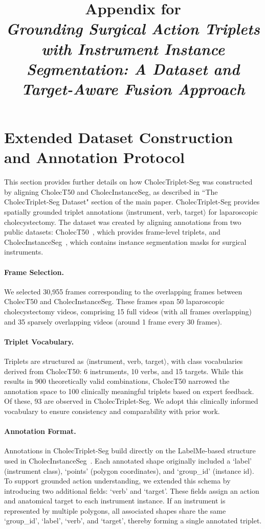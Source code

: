 \documentclass[11pt]{article}
\title{Appendix for\\[0.3em] \textit{Grounding Surgical Action Triplets with Instrument Instance Segmentation: A
Dataset and Target-Aware Fusion Approach}}
\date{} %
\begin{document}
\linenumbers

\maketitle

\section{Extended Dataset Construction and Annotation Protocol}
This section provides further details on how CholecTriplet-Seg was constructed by aligning CholecT50 and CholecInstanceSeg, as described in ``The CholecTriplet-Seg Dataset" section of the main paper. CholecTriplet-Seg provides spatially grounded triplet annotations $\langle$instrument, verb, target$\rangle$ for laparoscopic cholecystectomy. The dataset was created by aligning annotations from two public datasets: CholecT50~\cite{nwoye2022rendezvous}, which provides frame-level triplets, and CholecInstanceSeg~\cite{alabi2025cholecinstanceseg}, which contains instance segmentation masks for surgical instruments.

\paragraph{Frame Selection.}  
We selected 30,955 frames corresponding to the overlapping frames between CholecT50 and CholecInstanceSeg. These frames span 50 laparoscopic cholecystectomy videos, comprising 15 full videos (with all frames overlapping) and 35 sparsely overlapping videos (around 1 frame every 30 frames). 


\paragraph{Triplet Vocabulary.}
Triplets are structured as $\langle$instrument, verb, target$\rangle$, with class vocabularies derived from CholecT50: 6 instruments, 10 verbs, and 15 targets. While this results in 900 theoretically valid combinations, CholecT50 narrowed the annotation space to 100 clinically meaningful triplets based on expert feedback. Of these, 93 are observed in CholecTriplet-Seg. We adopt this clinically informed vocabulary to ensure consistency and comparability with prior work.

\paragraph{Annotation Format.}
Annotations in CholecTriplet-Seg build directly on the LabelMe-based structure used in CholecInstanceSeg~\cite{alabi2025cholecinstanceseg}. Each annotated shape originally included a `label' (instrument class), `points' (polygon coordinates), and `group\_id' (instance id). To support grounded action understanding, we extended this schema by introducing two additional fields: `verb' and `target'. These fields assign an action and anatomical target to each instrument instance. If an instrument is represented by multiple polygons, all associated shapes share the same `group\_id', `label', `verb', and `target', thereby forming a single annotated triplet.
\end{document}
